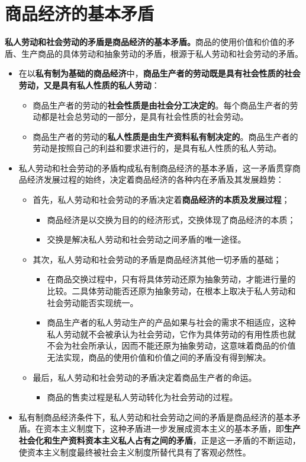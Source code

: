 \documentclass[12pt,openany]{ctexbook}
\begin{document}
\section{商品经济的基本矛盾}
\begin{mdquote}
\textbf{私人劳动和社会劳动的矛盾是商品经济的基本矛盾。}商品的使用价值和价值的矛盾、生产商品的具体劳动和抽象劳动的矛盾，根源于私人劳动和社会劳动的矛盾。
\end{mdquote}
\begin{itemize}
  \item 在以\textbf{私有制为基础的商品经济}中，\textbf{商品生产者的劳动既是具有社会性质的社会劳动，又是具有私人性质的私人劳动}：
\begin{itemize}
  \item 商品生产者的劳动的\textbf{社会性质是由社会分工决定的}。每个商品生产者的劳动都是社会总劳动的一部分，是具有社会性质的社会劳动。
  \item 商品生产者的劳动的\textbf{私人性质是由生产资料私有制决定的}。商品生产者的劳动是按照自己的利益和要求进行的，是具有私人性质的私人劳动。
\end{itemize}
  \item 私人劳动和社会劳动的矛盾构成私有制商品经济的基本矛盾，这一矛盾贯穿商品经济发展过程的始终，决定着商品经济的各种内在矛盾及其发展趋势：
\begin{itemize}
  \item 首先，私人劳动和社会劳动的矛盾决定着\textbf{商品经济的本质及发展过程}；
\begin{itemize}
  \item 商品经济是以交换为目的的经济形式，交换体现了商品经济的本质；
  \item 交换是解决私人劳动和社会劳动之间矛盾的唯一途径。
\end{itemize}
  \item 其次，私人劳动和社会劳动的矛盾是商品经济其他一切矛盾的基础；
\begin{itemize}
  \item 在商品交换过程中，只有将具体劳动还原为抽象劳动，才能进行量的比较。二具体劳动能否还原为抽象劳动，在根本上取决于私人劳动和社会劳动能否实现统一。
  \item 商品生产者的私人劳动生产的产品如果与社会的需求不相适应，这种私人劳动就不会被承认为社会劳动，它作为具体劳动的有用性质也就不会为社会所承认，因而不能还原为抽象劳动，这意味着商品的价值无法实现，商品的使用价值和价值之间的矛盾没有得到解决。
\end{itemize}
  \item 最后，私人劳动和社会劳动的矛盾决定着商品生产者的命运。
\begin{itemize}
  \item 商品的售卖过程是私人劳动转化为社会劳动的过程。
\end{itemize}
\end{itemize}
  \item 私有制商品经济条件下，私人劳动和社会劳动之间的矛盾是商品经济的基本矛盾。在资本主义制度下，这种矛盾进一步发展成资本主义的基本矛盾，即\textbf{生产社会化和生产资料资本主义私人占有之间的矛盾}，正是这一矛盾的不断运动，使资本主义制度最终被社会主义制度所替代具有了客观必然性。
\end{itemize}
\end{document}
